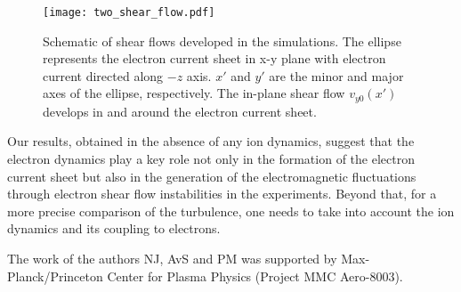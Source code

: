 \documentclass[aip,preprint]{revtex4-1}
\begin{document}
 \begin{figure}
\texttt{[image: two\_shear\_flow.pdf]}
\caption{\label{fig:two_shear_flow} Schematic of shear flows developed in the simulations. The ellipse represents the electron current sheet in x-y plane with electron current directed along $-z$ axis. $x'$ and $y'$ are the minor and major axes of the ellipse, respectively. The in-plane shear flow $v_{y0}(x')$ develops in and around the electron current sheet.}
\end{figure}
Our results, obtained in the absence of any ion dynamics, suggest that the electron dynamics play a key role not only in the formation of the electron current sheet but also in the generation of the electromagnetic fluctuations through electron shear flow instabilities in the experiments. Beyond that, for a more precise comparison of the turbulence, one needs to take into account the ion dynamics and its coupling to electrons. 


\begin{acknowledgments}
The work of the authors NJ, AvS and PM was supported by Max-Planck/Princeton Center for Plasma Physics (Project MMC Aero-8003).
\end{acknowledgments}


\end{document}
